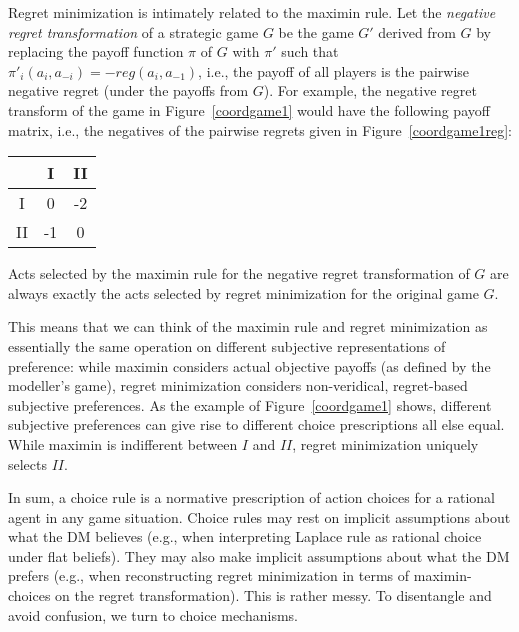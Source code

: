 \documentclass[fleqn,reqno,11pt]{article}
\begin{document}

  

Regret minimization is intimately related to the maximin rule. Let the \emph{negative regret
  transformation} of a strategic game $G$ be the game $G'$ derived from $G$ by replacing the payoff
function $\pi$ of $G$ with $\pi'$ such that $\pi'_i(a_i, a_{-i}) = - reg(a_i,a_{-1})$, i.e.,
the payoff of all players is the pairwise negative regret (under the payoffs from $G$). For
example, the negative regret transform of the game in Figure~\ref{coordgame1} would have the
following payoff matrix, i.e., the negatives of the pairwise regrets given in
Figure~\ref{coordgame1reg}:

\begin{center}
    \begin{tabular}{ccc}
      \toprule
      & I & II \\
      \midrule
      I & 0 & -2 \\
      II & -1 & 0\\
      \bottomrule
    \end{tabular}
\end{center}

\noindent Acts selected by the maximin rule for the negative regret transformation of $G$ are
always exactly the acts selected by regret minimization for the original game $G$.

This means that we can think of the maximin rule and regret minimization as essentially the
same operation on different subjective representations of preference: while maximin considers
actual objective payoffs (as defined by the modeller's game), regret minimization considers
non-veridical, regret-based subjective preferences. As the example of Figure~\ref{coordgame1}
shows, different subjective preferences can give rise to different choice prescriptions all
else equal. While maximin is indifferent between $I$ and $II$, regret minimization uniquely
selects $II$.

In sum, a choice rule is a normative prescription of action choices for a rational agent in any
game situation. Choice rules may rest on implicit assumptions about what the DM believes (e.g.,
when interpreting Laplace rule as rational choice under flat beliefs). They may also make
implicit assumptions about what the DM prefers (e.g., when reconstructing regret minimization
in terms of maximin-choices on the regret transformation). This is rather messy. To disentangle
and avoid confusion, we turn to choice mechanisms.
\end{document}

